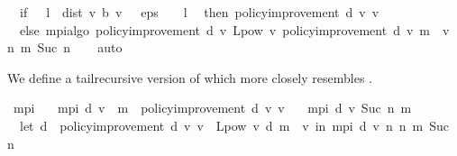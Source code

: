 \begin{isabellebody}
\ \ if\ {}\ {\isacharasterisk}{\kern0pt}\ l\ {\isacharasterisk}{\kern0pt}\ dist\ v\ {\isacharparenleft}{\kern0pt}{\isasymL}\isactrlsub b\ v{\isacharparenright}{\kern0pt}\ {\isacharless}{\kern0pt}\ \ eps\ {\isacharasterisk}{\kern0pt}\ {\isacharparenleft}{\kern0pt}{}\ {\isacharminus}{\kern0pt}\ l{\isacharparenright}{\kern0pt}\isanewline
\ \ then\ {\isacharparenleft}{\kern0pt}policy{\isacharunderscore}{\kern0pt}improvement\ d\ v{\isacharcomma}{\kern0pt}\ v{\isacharparenright}{\kern0pt}\isanewline
\ \ else\ mpi{\isacharunderscore}{\kern0pt}algo\ {\isacharparenleft}{\kern0pt}policy{\isacharunderscore}{\kern0pt}improvement\ d\ v{\isacharparenright}{\kern0pt}\ {\isacharparenleft}{\kern0pt}L{\isacharunderscore}{\kern0pt}pow\ v\ {\isacharparenleft}{\kern0pt}policy{\isacharunderscore}{\kern0pt}improvement\ d\ v{\isacharparenright}{\kern0pt}\ {\isacharparenleft}{\kern0pt}m\ {}\ v{\isacharparenright}{\kern0pt}{\isacharparenright}{\kern0pt}\ {\isacharparenleft}{\kern0pt}{\isasymlambda}n{\isachardot}{\kern0pt}\ m\ {\isacharparenleft}{\kern0pt}Suc\ n{\isacharparenright}{\kern0pt}{\isacharparenright}{\kern0pt}{\isacharparenright}{\kern0pt}{\isachardoublequoteclose}\isanewline
%
\isadelimproof
\ \ %
\endisadelimproof
%
\isatagproof
{}\isamarkupfalse%
\ auto%
\endisatagproof
{\isafoldproof}%
%
\isadelimproof
%
\endisadelimproof
%
\begin{isamarkuptext}%
We define a tailrecursive version of  which more closely resembles .%
\end{isamarkuptext}\isamarkuptrue%
\isamarkupfalse%
\ mpi{\isacharprime}{\kern0pt}\ \isanewline
\ \ {\isachardoublequoteopen}mpi{\isacharprime}{\kern0pt}\ d\ v\ {}\ m\ {\isacharequal}{\kern0pt}\ {\isacharparenleft}{\kern0pt}policy{\isacharunderscore}{\kern0pt}improvement\ d\ v{\isacharcomma}{\kern0pt}\ v{\isacharparenright}{\kern0pt}{\isachardoublequoteclose}\ {\isacharbar}{\kern0pt}\isanewline
\ \ {\isachardoublequoteopen}mpi{\isacharprime}{\kern0pt}\ d\ v\ {\isacharparenleft}{\kern0pt}Suc\ n{\isacharparenright}{\kern0pt}\ m\ {\isacharequal}{\kern0pt}\ {\isacharparenleft}{\kern0pt}\isanewline
\ \ let\ d{\isacharprime}{\kern0pt}\ {\isacharequal}{\kern0pt}\ policy{\isacharunderscore}{\kern0pt}improvement\ d\ v{\isacharsemicolon}{\kern0pt}\ v{\isacharprime}{\kern0pt}\ {\isacharequal}{\kern0pt}\ L{\isacharunderscore}{\kern0pt}pow\ v\ d{\isacharprime}{\kern0pt}\ {\isacharparenleft}{\kern0pt}m\ {}\ v{\isacharparenright}{\kern0pt}\ in\ mpi{\isacharprime}{\kern0pt}\ d{\isacharprime}{\kern0pt}\ v{\isacharprime}{\kern0pt}\ n\ {\isacharparenleft}{\kern0pt}{\isasymlambda}n{\isachardot}{\kern0pt}\ m\ {\isacharparenleft}{\kern0pt}Suc\ n{\isacharparenright}{\kern0pt}{\isacharparenright}{\kern0pt}{\isacharparenright}{\kern0pt}{\isachardoublequoteclose}\isanewline

\end{isabellebody}
